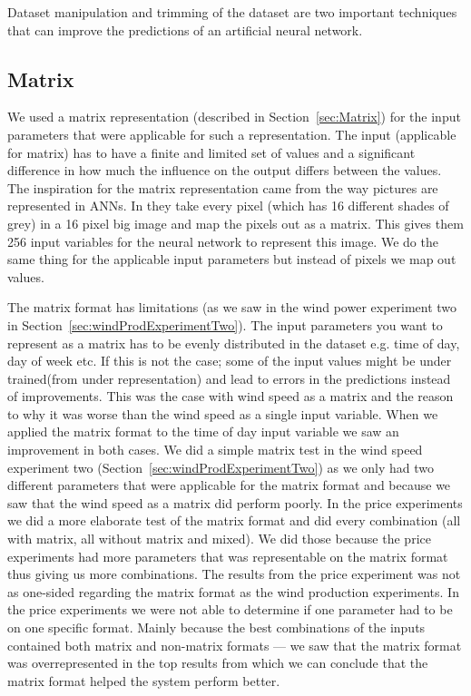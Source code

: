Dataset manipulation and trimming of the dataset are two important techniques that can improve the predictions of an artificial neural network.
\subsection{Matrix}
We used a matrix representation (described in Section~\ref{sec:Matrix}) for the input parameters that were applicable for such a representation. The input (applicable for matrix) has to have a finite and limited set of values and a significant difference in how much the influence on the output differs between the values. The inspiration for the matrix representation came from the way pictures are represented in ANNs. In \cite{knerr1992handwritten} they take every pixel (which has 16 different shades of grey) in a 16 pixel big image and map the pixels out as a matrix. This gives them 256 input variables for the neural network to represent this image. We do the same thing for the applicable input parameters but instead of pixels we map out values.

The matrix format has limitations (as we saw in the wind power experiment two in Section~\ref{sec:windProdExperimentTwo}). The input parameters you want to represent as a matrix has to be evenly distributed in the dataset e.g. time of day, day of week etc. If this is not the case; some of the input values might be under trained(from under representation) and lead to errors in the predictions instead of improvements. This was the case with wind speed as a matrix and the reason to why it was worse than the wind speed as a single input variable. When we applied the matrix format to the time of day input variable we saw an improvement in both cases. We did a simple matrix test in the wind speed experiment two (Section~\ref{sec:windProdExperimentTwo}) as we only had two different parameters that were applicable for the matrix format and because we saw that the wind speed as a matrix did perform poorly. In the price experiments we did a more elaborate test of the matrix format and did every combination (all with matrix, all without matrix and mixed). We did those because the price experiments had more parameters that was representable on the matrix format thus giving us more combinations. The results from the price experiment was not as one-sided regarding the matrix format as the wind production experiments. In the price experiments we were not able to determine if one parameter had to be on one specific format. Mainly because the best combinations of the inputs contained both matrix and non-matrix formats --- we saw that the matrix format was overrepresented in the top results from which we can conclude that the matrix format helped the system perform better.

